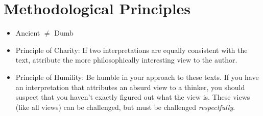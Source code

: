 \documentclass[11pt]{article}
\begin{document}
\section*{Methodological Principles}

\begin{itemize} 
\item{Ancient $\neq$ Dumb}
\item{Principle of Charity: If two interpretations are equally consistent with the text, attribute the more philosophically interesting view to the author.}
\item{Principle of Humility: Be humble in your approach to these texts. If you have an interpretation that attributes an absurd view to a thinker, you should suspect that you haven't exactly figured out what the view is. These views (like all views) can be challenged, but must be challenged \emph{respectfully}.}
\end{itemize}


\end{document}
